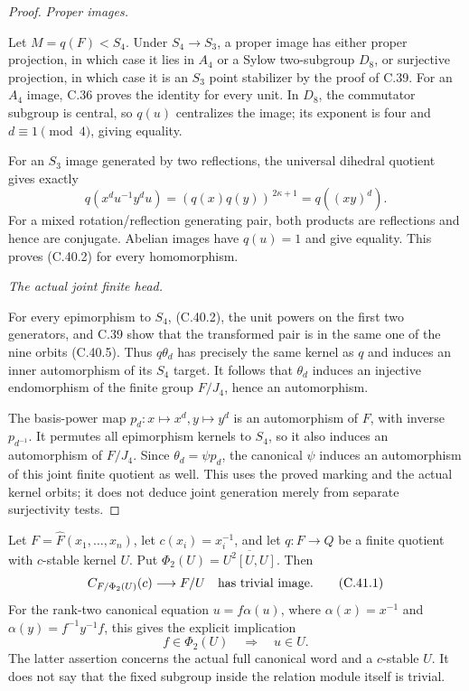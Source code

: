 \begin{proof}
\emph{Proper images.}\par
Let \(M=q(F)<S_4\). Under \(S_4\to S_3\), a proper
image has either proper projection, in which case it
lies in \(A_4\) or a Sylow two-subgroup \(D_8\), or
surjective projection, in which case it is an \(S_3\)
point stabilizer by the proof of C.39.
For an \(A_4\) image, C.36 proves the identity for every
unit. In \(D_8\), the commutator subgroup is central,
so \(q(u)\) centralizes the image; its exponent is
four and \(d\equiv1\pmod4\), giving equality.

For an \(S_3\) image generated by two reflections,
the universal dihedral quotient gives exactly
\[
          q(x^d u^{-1}y^d u)
              =(q(x)q(y))^{\,2\kappa+1}
              =q((xy)^d).
\]
For a mixed rotation/reflection generating pair, both
products are reflections and hence are conjugate.
Abelian images have \(q(u)=1\) and give equality.
This proves (C.40.2) for every homomorphism.

\emph{The actual joint finite head.}\par
For every epimorphism to \(S_4\), (C.40.2), the unit
powers on the first two generators, and C.39 show that
the transformed pair is in the same one of the nine
orbits (C.40.5). Thus \(q\theta_d\) has precisely the
same kernel as \(q\) and induces an inner automorphism
of its \(S_4\) target. It follows that \(\theta_d\)
induces an injective endomorphism of the finite group
\(F/J_4\), hence an automorphism.

The basis-power map \(p_d:x\mapsto x^d,y\mapsto y^d\)
is an automorphism of \(F\), with inverse \(p_{d^{-1}}\).
It permutes all epimorphism kernels to \(S_4\), so it
also induces an automorphism of \(F/J_4\).
Since \(\theta_d=\psi p_d\), the canonical \(\psi\)
induces an automorphism of this joint finite quotient
as well. This uses the proved marking and the actual
kernel orbits; it does not deduce joint generation
merely from separate surjectivity tests.
\end{proof}


Let $F=\widehat F(x_1,\ldots,x_n)$, let $c(x_i)=x_i^{-1}$,
and let $q:F\to Q$ be a finite quotient with $c$-stable kernel $U$.
Put $\Phi_2(U)=\overline{U^2[U,U]}$. Then
\[
 C_{F/\Phi_2(U)}(c)\longrightarrow F/U
                 \quad\hbox{has trivial image}.                 \tag{C.41.1}
\]
For the rank-two canonical equation $u=f\alpha(u)$,
where $\alpha(x)=x^{-1}$ and $\alpha(y)=f^{-1}y^{-1}f$,
this gives the explicit implication
\[
                  f\in\Phi_2(U)\quad\Longrightarrow\quad u\in U.
                                                                    \tag{C.41.2}
\]
The latter assertion concerns the actual full canonical word and a
$c$-stable $U$. It does not say that the fixed subgroup inside the
relation module itself is trivial.

